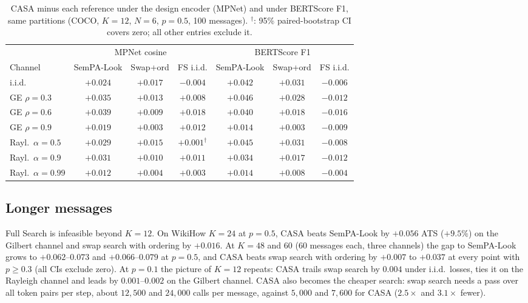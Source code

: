 \documentclass[journal,onecolumn,11pt,draftclsnofoot]{IEEEtran}
\begin{document}
\begin{table}[t]
\centering
\caption{CASA minus each reference under the design encoder (MPNet) and under BERTScore F1, same partitions (COCO, $K=12$, $N=6$, $p=0.5$, 100 messages). $^\dagger$: 95\% paired-bootstrap CI covers zero; all other entries exclude it.}
\label{tab:bertscore}
\begin{tabular}{lccc@{\hskip 12pt}ccc}
\toprule
& \multicolumn{3}{c}{MPNet cosine} & \multicolumn{3}{c}{BERTScore F1}\\
Channel & SemPA-Look & Swap+ord & FS i.i.d. & SemPA-Look & Swap+ord & FS i.i.d.\\
\midrule
i.i.d. & $+0.024$ & $+0.017$ & $-0.004$ & $+0.042$ & $+0.031$ & $-0.006$\\
GE $\rho=0.3$ & $+0.035$ & $+0.013$ & $+0.008$ & $+0.046$ & $+0.028$ & $-0.012$\\
GE $\rho=0.6$ & $+0.039$ & $+0.009$ & $+0.018$ & $+0.040$ & $+0.018$ & $-0.016$\\
GE $\rho=0.9$ & $+0.019$ & $+0.003$ & $+0.012$ & $+0.014$ & $+0.003$ & $-0.009$\\
Rayl.\ $\alpha=0.5$ & $+0.029$ & $+0.015$ & $+0.001^\dagger$ & $+0.045$ & $+0.031$ & $-0.008$\\
Rayl.\ $\alpha=0.9$ & $+0.031$ & $+0.010$ & $+0.011$ & $+0.034$ & $+0.017$ & $-0.012$\\
Rayl.\ $\alpha=0.99$ & $+0.012$ & $+0.004$ & $+0.003$ & $+0.014$ & $+0.008$ & $-0.004$\\
\bottomrule
\end{tabular}
\end{table}


\subsection{Longer messages}
Full Search is infeasible beyond $K=12$. On WikiHow $K=24$ at $p=0.5$, CASA beats SemPA-Look by $+0.056$ ATS ($+9.5\%$) on the Gilbert channel and swap search with ordering by $+0.016$. At $K=48$ and $60$ (60 messages each, three channels) the gap to SemPA-Look grows to $+0.062$--$0.073$ and $+0.066$--$0.079$ at $p=0.5$, and CASA beats swap search with ordering by $+0.007$ to $+0.037$ at every point with $p\ge0.3$ (all CIs exclude zero). At $p=0.1$ the picture of $K=12$ repeats: CASA trails swap search by $0.004$ under i.i.d.\ losses, ties it on the Rayleigh channel and leads by $0.001$--$0.002$ on the Gilbert channel. CASA also becomes the cheaper search: swap search needs a pass over all token pairs per step, about $12{,}500$ and $24{,}000$ calls per message, against $5{,}000$ and $7{,}600$ for CASA ($2.5\times$ and $3.1\times$ fewer).
\end{document}
